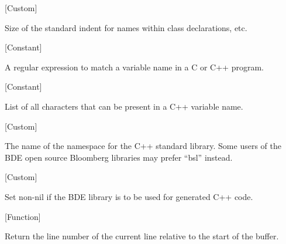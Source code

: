 \vspace{1em}
\noindent
{}
\usebox{\funcname}
 \hfill [Custom]

\begin{doc-string}
Size of the standard indent for names within class declarations, etc.
\end{doc-string}

\vspace{1em}
\noindent
{}
\usebox{\funcname}
 \hfill [Constant]

\begin{doc-string}
A regular expression to match a variable name in a C or C++ program.
\end{doc-string}

\vspace{1em}
\noindent
{}
\usebox{\funcname}
 \hfill [Constant]

\begin{doc-string}
List of all characters that can be present in a C++ variable name.
\end{doc-string}

\vspace{1em}
\noindent
{}
\usebox{\funcname}
 \hfill [Custom]

\begin{doc-string}
The name of the namespace for the C++ standard library.  Some users of the
BDE open source Bloomberg libraries may prefer ``bsl'' instead.
\end{doc-string}

\vspace{1em}
\noindent
{}
\usebox{\funcname}
 \hfill [Custom]

\begin{doc-string}
Set non-nil if the BDE library is to be used for generated C++ code.
\end{doc-string}

\vspace{1em}
\noindent
{}
\usebox{\funcname}
 \hfill [Function]

\begin{doc-string}
Return the line number of the current line relative to the start of the buffer.
\end{doc-string}

